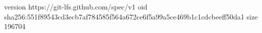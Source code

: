 version https://git-lfs.github.com/spec/v1
oid sha256:551f89543cd3ecb7af784585f564a672ce6f5a99a5ce469b1c1cdcbeeff50da1
size 196704
